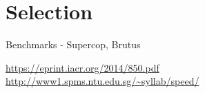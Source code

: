 \section{Selection}

Benchmarks - Supercop, Brutus

\url{https://eprint.iacr.org/2014/850.pdf}
\url{http://www1.spms.ntu.edu.sg/~syllab/speed/}
